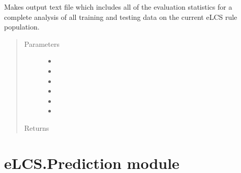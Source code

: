 \documentclass[letterpaper,10pt,english]{sphinxmanual}
\begin{document}
\begin{fulllineitems}
\begin{fulllineitems}
\end{fulllineitems}


\begin{fulllineitems}
\label{\detokenize{eLCS:eLCS.OutputFileManager.OutputFileManager.writePopStats}}
Makes output text file which includes all of the evaluation statistics for a complete analysis
of all training and testing data on the current eLCS rule population.
\begin{quote}\begin{description}
\item[{Parameters}] \leavevmode\begin{itemize}
\item {} 
 \textendash{} 

\item {} 
 \textendash{} 

\item {} 
 \textendash{} 

\item {} 
 \textendash{} 

\item {} 
 \textendash{} 

\item {} 
 \textendash{} 

\end{itemize}

\item[{Returns}] \leavevmode


\end{description}\end{quote}

\end{fulllineitems}


\end{fulllineitems}



\section{eLCS.Prediction module}
\label{\detokenize{eLCS:module-eLCS.Prediction}}\label{\detokenize{eLCS:elcs-prediction-module}}
\end{document}
